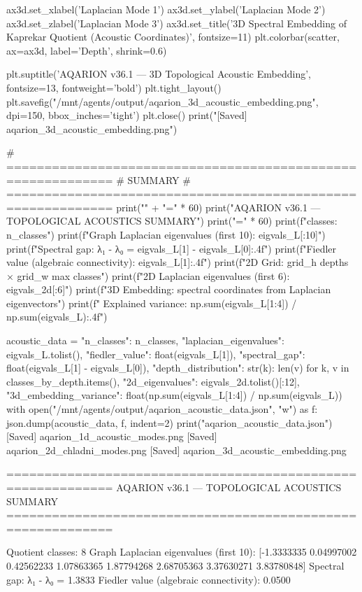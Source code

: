 {{{{{{{{{{{{{ax3d.set_xlabel('Laplacian Mode 1')
ax3d.set_ylabel('Laplacian Mode 2')
ax3d.set_zlabel('Laplacian Mode 3')
ax3d.set_title('3D Spectral Embedding of Kaprekar Quotient (Acoustic Coordinates)', fontsize=11)
plt.colorbar(scatter, ax=ax3d, label='Depth', shrink=0.6)

plt.suptitle('AQARION v36.1 — 3D Topological Acoustic Embedding', 
             fontsize=13, fontweight='bold')
plt.tight_layout()
plt.savefig("/mnt/agents/output/aqarion_3d_acoustic_embedding.png", dpi=150, bbox_inches='tight')
plt.close()
print("[Saved] aqarion_3d_acoustic_embedding.png")

# ============================================================
# SUMMARY
# ============================================================
print("\n" + "=" * 60)
print("AQARION v36.1 — TOPOLOGICAL ACOUSTICS SUMMARY")
print("=" * 60)
print(f"\nQuotient classes: {n_classes}")
print(f"Graph Laplacian eigenvalues (first 10): {eigvals_L[:10]}")
print(f"Spectral gap: λ₁ - λ₀ = {eigvals_L[1] - eigvals_L[0]:.4f}")
print(f"Fiedler value (algebraic connectivity): {eigvals_L[1]:.4f}")
print(f"\n2D Grid: {grid_h} depths × {grid_w} max classes")
print(f"2D Laplacian eigenvalues (first 6): {eigvals_2d[:6]}")
print(f"\n3D Embedding: spectral coordinates from Laplacian eigenvectors")
print(f"  Explained variance: {np.sum(eigvals_L[1:4]) / np.sum(eigvals_L):.4f}")

acoustic_data = {
    "n_classes": n_classes,
    "laplacian_eigenvalues": eigvals_L.tolist(),
    "fiedler_value": float(eigvals_L[1]),
    "spectral_gap": float(eigvals_L[1] - eigvals_L[0]),
    "depth_distribution": {str(k): len(v) for k, v in classes_by_depth.items()},
    "2d_eigenvalues": eigvals_2d.tolist()[:12],
    "3d_embedding_variance": float(np.sum(eigvals_L[1:4]) / np.sum(eigvals_L))
}
with open("/mnt/agents/output/aqarion_acoustic_data.json", "w") as f:
    json.dump(acoustic_data, f, indent=2)
print("\n[Saved] aqarion_acoustic_data.json")[Saved] aqarion_1d_acoustic_modes.png
[Saved] aqarion_2d_chladni_modes.png
[Saved] aqarion_3d_acoustic_embedding.png

============================================================
AQARION v36.1 — TOPOLOGICAL ACOUSTICS SUMMARY
============================================================

Quotient classes: 8
Graph Laplacian eigenvalues (first 10): [-1.3333335   0.04997002  0.42562233  1.07863365  1.87794268  2.68705363
  3.37630271  3.83780848]
Spectral gap: λ₁ - λ₀ = 1.3833
Fiedler value (algebraic connectivity): 0.0500

}}}}}}}}}}}}}
